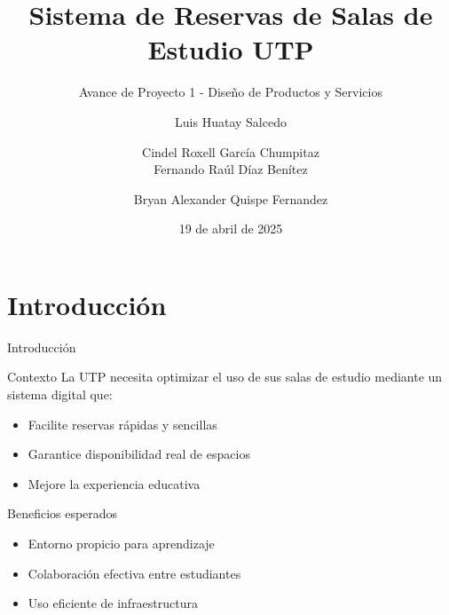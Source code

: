 \documentclass[10pt]{beamer}
\title{Sistema de Reservas de Salas de Estudio UTP}
\subtitle{Avance de Proyecto 1 - Diseño de Productos y Servicios}
\author{Luis Huatay Salcedo \and Cindel Roxell García Chumpitaz \\ Fernando Raúl Díaz Benítez \and Bryan Alexander Quispe Fernandez}
\institute{Universidad Tecnológica del Perú}
\date{19 de abril de 2025}
\begin{document}
\begin{frame}
\titlepage
\end{frame}

\section{Introducción}
\begin{frame}{Introducción}
\begin{block}{Contexto}
La UTP necesita optimizar el uso de sus salas de estudio mediante un sistema digital que:
\begin{itemize}
\item Facilite reservas rápidas y sencillas
\item Garantice disponibilidad real de espacios
\item Mejore la experiencia educativa
\end{itemize}
\end{block}

\begin{exampleblock}{Beneficios esperados}
\begin{itemize}
\item Entorno propicio para aprendizaje
\item Colaboración efectiva entre estudiantes
\item Uso eficiente de infraestructura
\end{itemize}
\end{exampleblock}
\end{frame}
\end{document}
